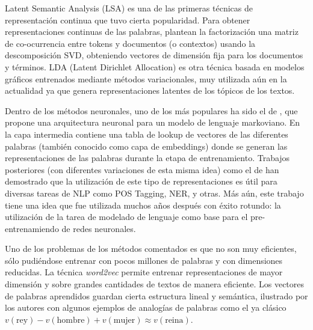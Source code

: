 Latent Semantic Analysis (LSA) \cite{landauer1997solution} es una de las primeras técnicas de representación continua que tuvo cierta popularidad. Para obtener representaciones continuas de las palabras, plantean la factorización una matriz de co-ocurrencia entre tokens y documentos (o contextos) usando la descomposición SVD, obteniendo vectores de dimensión fija para los documentos y términos. LDA (Latent Dirichlet Allocation) \cite{blei2003latent} es otra técnica basada en modelos gráficos entrenados mediante métodos variacionales, muy utilizada aún en la actualidad ya que genera representaciones latentes de los tópicos de los textos.

%

Dentro de los métodos neuronales, uno de los más populares ha sido el de \citet{bengio2003neural}, que propone una arquitectura neuronal para un modelo de lenguaje markoviano. %
En la capa intermedia contiene una tabla de lookup de vectores de las diferentes palabras (también conocido como capa de embeddings) donde se generan las representaciones de las palabras durante la etapa de entrenamiento. Trabajos posteriores (con diferentes variaciones de esta misma idea) como el de \citet{collobert2011natural} han demostrado que la utilización de este tipo de representaciones es útil para diversas tareas de NLP como POS Tagging, NER, y otras. Más aún, este trabajo tiene una idea que fue utilizada muchos años después con éxito rotundo: la utilización de la tarea de modelado de lenguaje como base para el pre-entrenamiendo de redes neuronales.

Uno de los problemas de los métodos comentados es que no son muy eficientes, sólo pudiéndose entrenar con pocos millones de palabras y con dimensiones reducidas. La técnica \emph{word2vec} \cite{mikolov2013efficient} permite entrenar representaciones de mayor dimensión y sobre grandes cantidades de textos de manera eficiente. Los vectores de palabras aprendidos guardan cierta estructura lineal y semántica, ilustrado por los autores con algunos ejemplos de analogías de palabras como el ya clásico $v(\text{rey}) - v(\text{hombre}) + v(\text{mujer}) \approx v(\text{reina})$.

